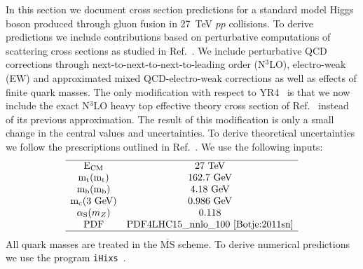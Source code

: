 \label{sec:he-lhc-ggF}
In this section we document cross section predictions for a standard
model Higgs boson produced through gluon fusion in 27~TeV $pp$ collisions.  To
derive predictions we include contributions based on perturbative
computations of scattering cross sections as studied in
Ref.~\cite{Anastasiou:2016cez}.  We include perturbative QCD
corrections through next-to-next-to-next-to-leading order (N$^3$LO), electro-weak (EW) and approximated mixed
QCD-electro-weak corrections as well as effects of finite quark
masses. The only modification with respect to YR4~\cite{deFlorian:2016spz} is that we
now include the exact N$^3$LO heavy top effective theory cross section of
Ref.~\cite{Mistlberger:2018etf} instead of its previous approximation. The
result of this modification is only a small change in the central values and
uncertainties. To derive theoretical uncertainties we follow the
prescriptions outlined in Ref.~\cite{Anastasiou:2016cez}.
We use the following inputs:
\begin{equation}
\begin{array}{c  c}
\hline
\text{E}_\text{CM} & 27~\text{TeV} \\
\text{m}_\text{t}(\text{m}_\text{t}) & 162.7~\text{GeV} \\
\text{m}_\text{b}(\text{m}_\text{b}) & 4.18~\text{GeV} \\
\text{m}_\text{c}(3 \text{ GeV}) & 0.986~\text{GeV} \\
\alpha_\text{S} (m_Z) & 0.118  \\
\text{PDF} & \text{PDF4LHC15\_nnlo\_100}\text{~\cite{Botje:2011sn}}\\
\hline
\end{array}
\end{equation}
All quark masses are treated in the $\overline{\text{MS}}$ scheme. To derive numerical predictions we use the program \texttt{iHixs}~\cite{Dulat:2018rbf}.

